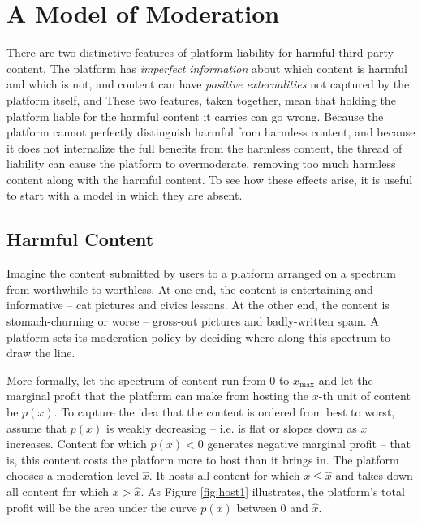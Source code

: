 \newcommand{\xmax}{x_{\text{max}}}
\newcommand{\xbi}{x_{\text{BI}}^*}
\newcommand{\xsl}{x_{\text{SL}}^*}

\section{A Model of Moderation}

There are two distinctive features of platform liability for harmful third-party content. The platform has \emph{imperfect information} about which content is harmful and which is not, and  content can have \emph{positive externalities} not captured by the platform itself, and  These two features, taken together, mean that holding the platform liable for the harmful content it carries can go wrong. Because the platform cannot perfectly distinguish harmful from harmless content, and because it does not internalize the full benefits from the harmless content, the thread of liability can cause the platform to overmoderate, removing too much harmless content along with the harmful content. To see how these effects arise, it is useful to start with a model in which they are absent.


\subsection{Harmful Content}

Imagine the content submitted by users to a platform arranged on a spectrum from worthwhile to worthless. At one end, the content is entertaining and informative -- cat pictures and civics lessons. At the other end, the content is stomach-churning or worse -- gross-out pictures and badly-written spam. A platform sets its moderation policy by deciding where along this spectrum to draw the line.

More formally, let the spectrum of content run from $0$ to $\xmax$ and let the marginal profit that the platform can make from hosting the $x$-th unit of content be $p(x)$. To capture the idea that the content is ordered from best to worst, assume that $p(x)$ is weakly decreasing -- i.e. is flat or slopes down as $x$ increases. Content for which $p(x) <0$ generates negative marginal profit -- that is, this content costs the platform more to host than it brings in. The platform chooses a moderation level $\hat{x}$. It hosts all content for which $x \le \hat{x}$ and takes down all content for which $x > \hat{x}$. As Figure \ref{fig:host1} illustrates, the platform's total profit will be the area under the curve $p(x)$ between $0$ and $\hat{x}$. 

